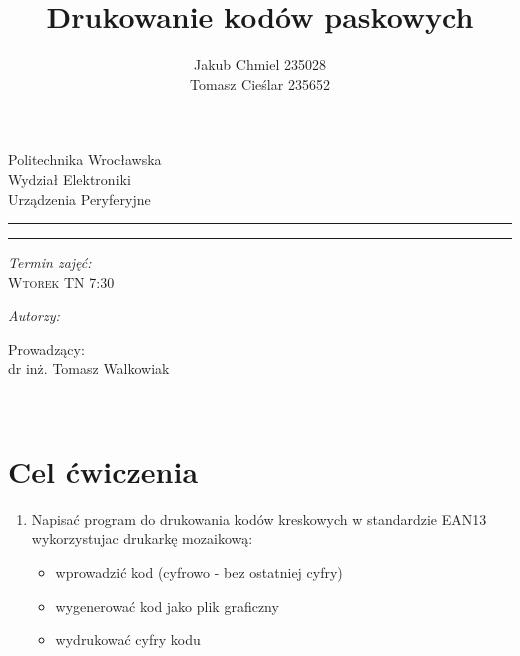 \documentclass[12pt,a4paper,notitlepage]{report}
\author{ Jakub Chmiel  235028 \\ Tomasz Cieślar 235652}
\title{Drukowanie kodów paskowych}
\makeatletter
\newcommand{\linia}{\rule{\linewidth}{0.4mm}}
\renewcommand{\maketitle}{\begin{titlepage}
    \vspace*{1cm}
    \begin{center}\small
    Politechnika Wrocławska\\
    Wydział Elektroniki\\
    Urządzenia Peryferyjne 
    \end{center}
    \vspace{4.5cm}
    \noindent\linia
    \begin{center}
      \LARGE \textsc{\@title}
         \end{center}
     \linia
    \vspace{0.5cm}
    \begin{flushright}
    \begin{minipage}{6cm}
    
     \vspace{4cm}
     \textit{\small Termin zajęć:}\\
     \normalsize \textsc{Wtorek TN 7:30} \par
	\vspace{0.3cm}    
    \textit{\small Autorzy:}\\
    \normalsize \textsc{\@author} \par
     \vspace{0.3cm}
        Prowadzący: \\ dr inż. Tomasz Walkowiak

    \end{minipage}
    \vspace{1cm}
     {\small }\\
       
     \end{flushright}
    \vspace*{\stretch{3}}
    \begin{center}
    \@date
    \end{center}
  \end{titlepage}%
}
\makeatother
\begin{document}
\maketitle

\newpage
\tableofcontents
\newpage
\renewcommand*\thesection{\arabic{section}}
\section{Cel ćwiczenia}
\begin{enumerate}
\item Napisać program do drukowania kodów kreskowych w standardzie EAN13 wykorzystujac drukarkę mozaikową:
\begin{itemize}
\item wprowadzić kod (cyfrowo - bez ostatniej cyfry) 
\item wygenerować kod jako plik graficzny
\item wydrukować cyfry kodu
\end{itemize}
\end{enumerate}
\end{document}
